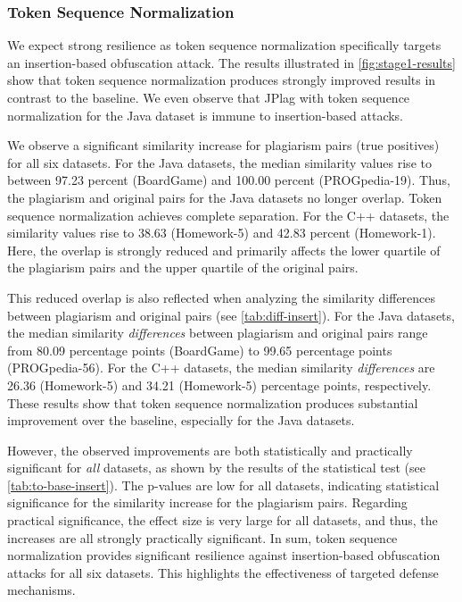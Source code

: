 \subsubsection{Token Sequence Normalization}
We expect strong resilience as token sequence normalization specifically targets an insertion-based obfuscation attack.
The results illustrated in \autoref{fig:stage1-results} show that token sequence normalization produces strongly improved results in contrast to the baseline. We even observe that JPlag with token sequence normalization for the Java dataset is immune to insertion-based attacks.

We observe a significant similarity increase for plagiarism pairs (true positives) for all six datasets.
For the Java datasets, the median similarity values rise to between 97.23 percent (BoardGame) and 100.00 percent (PROGpedia-19).
Thus, the plagiarism and original pairs for the Java datasets no longer overlap. Token sequence normalization achieves complete separation.
For the C++ datasets, the similarity values rise to 38.63 (Homework-5) and 42.83 percent (Homework-1).
Here, the overlap is strongly reduced and primarily affects the lower quartile of the plagiarism pairs and the upper quartile of the original pairs.

This reduced overlap is also reflected when analyzing the similarity differences between plagiarism and original pairs (see \autoref{tab:diff-insert}).
For the Java datasets, the median similarity \textit{differences} between plagiarism and original pairs range from 80.09 percentage points (BoardGame) to 99.65 percentage points (PROGpedia-56).
For the C++ datasets, the median similarity \textit{differences} are 26.36 (Homework-5) and 34.21 (Homework-5) percentage points, respectively.
These results show that token sequence normalization produces substantial improvement over the baseline, especially for the Java datasets. 

However, the observed improvements are both statistically and practically significant for \textit{all} datasets, as shown by the results of the statistical test (see \autoref{tab:to-base-insert}).
The p-values are low for all datasets, indicating statistical significance for the similarity increase for the plagiarism pairs.
Regarding practical significance, the effect size is very large for all datasets, and thus, the increases are all strongly practically significant. 
In sum, token sequence normalization provides significant resilience against insertion-based obfuscation attacks for all six datasets.
This highlights the effectiveness of targeted defense mechanisms.

